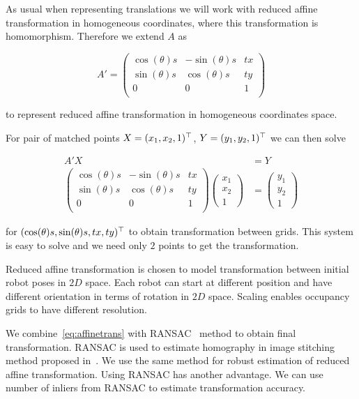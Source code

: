 As usual when representing translations we will work with reduced affine transformation in homogeneous coordinates, where this transformation is homomorphism. Therefore we extend $A$ as

\begin{equation}
    A' =
    \begin{pmatrix}
        \cos(\theta)s & -\sin(\theta)s & tx \\
        \sin(\theta)s & \cos(\theta)s & ty \\
        0 & 0 & 1 \\
    \end{pmatrix}
\end{equation}

to represent reduced affine transformation in homogeneous coordinates space.

For pair of matched points $X=(x_1,x_2,1)^\top$, $Y=(y_1, y_2, 1)^\top$ we can then solve

\begin{align}
    A'X &= Y \label{eq:affinetrans}\\
    \begin{pmatrix}
        \cos(\theta)s & -\sin(\theta)s & tx \\
        \sin(\theta)s & \cos(\theta)s & ty \\
        0 & 0 & 1 \\
    \end{pmatrix}
    \begin{pmatrix}
        x_1 \\
        x_2 \\
        1
    \end{pmatrix}
    &=
    \begin{pmatrix}
        y_1 \\
        y_2 \\
        1
    \end{pmatrix}
\end{align}

for $(\cos(\theta)s, \sin(\theta)s, tx, ty)^\top$ to obtain transformation between grids. This system is easy to solve and we need only $2$ points to get the transformation.

Reduced affine transformation is chosen to model transformation between initial robot poses in $2D$ space. Each robot can start at different position and have different orientation in terms of rotation in $2D$ space. Scaling enables occupancy grids to have different resolution.

We combine~\eqref{eq:affinetrans} with \gls{RANSAC}~\cite{fischler1981random} method to obtain final transformation. \gls{RANSAC} is used to estimate homography in image stitching method proposed in~\cite{Brown2006}. We use the same method for robust estimation of reduced affine transformation. Using \gls{RANSAC} has another advantage. We can use number of inliers from \gls{RANSAC} to estimate transformation accuracy.

